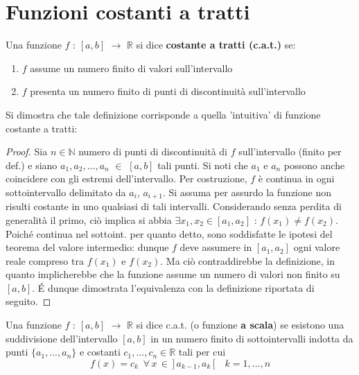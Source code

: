 \documentclass[10pt, oneside]{book}
\theoremstyle{plain}
\begin{document}
\section{Funzioni costanti a tratti}
\begin{defin}
    Una funzione $f$ : $[a,b]$ $\rightarrow$ $\mathbb{R}$ si dice \textbf{costante a tratti (c.a.t.)} se:
    \begin{enumerate}
        \item $f$ assume un numero finito di valori sull'intervallo
        \item $f$ presenta un numero finito di punti di discontinuità sull'intervallo
    \end{enumerate}
\end{defin}
Si dimostra che tale definizione corrisponde a quella 'intuitiva' di funzione costante a tratti:
\begin{proof}
    Sia $n \in \mathbb{N}$ numero di punti di discontinuità di $f$ sull'intervallo (finito per def.) e siano $a_1, a_2, ..., a_n$ $\in$ $[a,b]$ tali punti. Si noti che $a_1$ e $a_n$ possono anche coincidere con gli estremi dell'intervallo. Per costruzione, $f$ è continua in ogni sottointervallo delimitato da $a_i$, $a_{i+1}$. Si assuma per assurdo la funzione non risulti costante in uno qualsiasi di tali intervalli. Considerando senza perdita di generalità il primo, ciò implica si abbia $\exists x_1, x_2 \in [a_1, a_2]$ : $f(x_1) \neq f(x_2)$. Poiché continua nel sottoint. per quanto detto, sono soddisfatte le ipotesi del teorema del valore intermedio: dunque $f$ deve assumere in $[a_1, a_2]$ ogni valore reale compreso tra $f(x_1)$ e $f(x_2)$. Ma ciò contraddirebbe la definizione, in quanto implicherebbe che la funzione assume un numero di valori non finito su $[a,b]$. \'E dunque dimostrata l'equivalenza con la definizione riportata di seguito.
\end{proof}
\begin{defin}
    Una funzione $f$ : $[a,b]$ $\rightarrow$ $\mathbb{R}$ si dice c.a.t. (o funzione \textbf{a scala}) se esistono una suddivisione dell'intervallo $[a,b]$ in un numero finito di sottointervalli indotta da punti $\{a_1, ..., a_n\}$ e costanti $c_1, ..., c_n \in \mathbb{R}$ tali per cui
    \[f(x) = c_k \enspace \forall \, x \, \in \, \big] \, a_{k-1}, a_k \, \big[ \quad k=1, ..., n\]
\end{defin}
\end{document}
